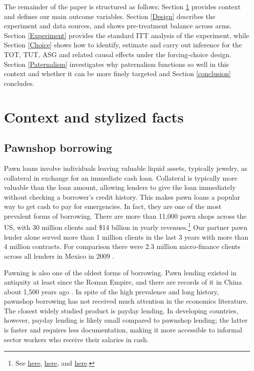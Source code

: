 \documentclass[12pt, a4paper]{article}
\begin{document}
The remainder of the paper is structured as follows:  Section \ref{context} provides context and defines our main outcome variables. Section \ref{Design} describes the experiment and data sources, and shows pre-treatment balance across arms. Section \ref{Experiment} provides the standard ITT analysis of the experiment, while Section \ref{Choice} shows how to identify, estimate and carry out inference for the TOT, TUT, ASG and related causal effects under the forcing-choice design. Section \ref{Paternalism} investigates why paternalism functions so well in this context and whether it can be more finely targeted and Section \ref{conclusion} concludes.


\section{Context and stylized facts} \label{context}

\subsection{Pawnshop borrowing}
    
Pawn loans involve individuals leaving valuable liquid assets, typically jewelry, as collateral in exchange for an immediate cash loan. Collateral is typically more valuable than the loan amount, allowing lenders to give the loan immediately without checking a borrower's credit history. This makes pawn loans a popular way to get cash to pay for emergencies. In fact, they are one of the most prevalent forms of borrowing. There are more than 11,000 pawn shops across the US, with 30 million clients and \$14 billion in yearly revenues.\footnote{See
\href{https://tinyurl.com/ybm56dpe}{here}, \href{https://tinyurl.com/y9zdcgws}{here}, and \href{https://tinyurl.com/y59ptdam}{here}.}
Our partner pawn lender alone served more than 1 million clients in the last 3 years with more than 4 million contracts. For comparison there were 2.3 million micro-finance clients across all lenders in Mexico in 2009 \citep{Pedroza:2010}. 

Pawning is also one of the oldest forms of borrowing. Pawn lending existed in antiquity at least since the Roman Empire, and there are records of it in China about 1,500 years ago \citep{PawnShops}. In spite of the high prevalence and long history, pawnshop borrowing has not received much attention in the economics literature. The closest widely studied product is payday lending. In developing countries, however, payday lending is likely small compared to pawnshop lending; the latter is faster and requires less documentation, making it more accessible to informal sector workers who receive their salaries in cash. %
\end{document}
